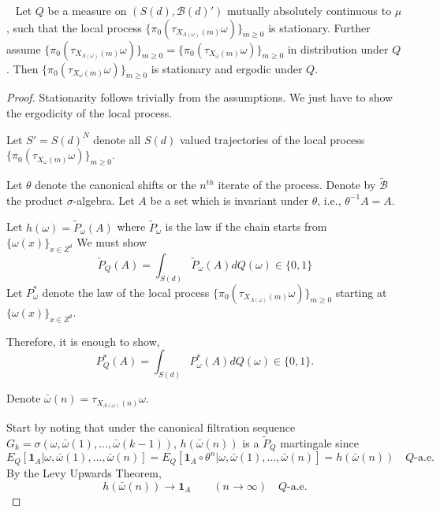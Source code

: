 \documentclass[10pt,a4paper]{amsart}
\def\mathbb#1{#1}%
\def\mathscr#1{#1}%
\begin{document}
\begin{lemma}~\label{equivalence}
    Let $\mathbb{Q}$ be a measure on $(\mathscr{S}(d), \mathcal{B}(d)')$ mutually absolutely continuous to
   $\mu$, such that the local process $\{\pi_0(\tau_{X_{\Lambda(\omega)}(m)}\omega)\}_{m \geq 0}$ is stationary. Further assume $\{\pi_0(\tau_{X_{\Lambda(\omega)}(m)}\omega)\}_{m \geq 0}=\{\pi_0(\tau_{X_{\omega}(m)}\omega)\}_{m \geq 0}$ in distribution under $\mathbb{Q}$. Then $\{\pi_0(\tau_{X_{\omega}(m)}\omega)\}_{m \geq 0}$ is stationary and ergodic under $\mathbb{Q}$.
\end{lemma}

\begin{proof}
Stationarity follows trivially from the assumptions. We just have to show the ergodicity of the local process. 

Let $\mathscr{S}'= S(d)^{\mathbb{N}}$ denote all $S(d)$ valued trajectories of the local process $\{\pi_0(\tau_{X_{\omega}(m)}\omega)\}_{m \geq 0}$.

Let $\theta$ denote the canonical shifts or the $n^{th}$ iterate of the process. Denote by $\tilde{\mathcal{B}}$ the product $\sigma$-algebra. Let $A$ be a set which is invariant under $\theta$, i.e., $\theta^{-1} A = A$. 
 
Let $h(\omega) =\tilde{P}_{\omega}(A) $ where $\tilde{P}_\omega$ is the law if the chain starts from \\$\{\omega(x)\}_{x \in \mathbb{Z}^d}$
We must show 
\[
\tilde{P}_{\mathbb{Q}} (A) = \int_{\mathscr{S}(d)} \tilde{P}_{\omega}(A) d\mathbb{Q}(\omega) \in \{0,1\}
\]
Let $P^*_{\omega}$ denote the law of the local process $\{\pi_0(\tau_{X_{\Lambda(\omega)}(m)}\omega)\}_{m \geq 0}$ starting at $\{\omega(x)\}_{x \in \mathbb{Z}^d}$. 

Therefore, it is enough to show, \[
{P}^*_{\mathbb{Q}} (A) = \int_{\mathscr{S}(d)}P^*_{\omega}(A) d\mathbb{Q}(\omega) \in  \{0, 1\}.
\]

Denote $\bar{\omega}(n) = \tau_{X_{\Lambda(\omega)}(n)} \omega$. 

Start by noting that under the canonical filtration sequence $\mathscr{G}_{k}= \sigma(\omega, \bar{\omega}(1),\dots,\bar{\omega}(k-1))$,  
$h(\bar{\omega}(n))$ is a $\tilde{P}_{\mathbb{Q}}$ martingale since 
\[
\mathbb{E}_{\mathbb{Q}} [ \boldsymbol{1}_{A}| \omega, \bar{\omega}(1),\dots, \bar{\omega}({n}) ] = \mathbb{E}_{\mathbb{Q}} [ \boldsymbol{1}_{A}\circ \theta^n | \omega, \bar{\omega}(1),\dots, \bar{\omega}({n}) ] = h(\bar{\omega}(n)) \quad \mathbb{Q}\text{-a.e.}
\]
By the Levy Upwards Theorem,
\begin{equation}\label{eq:marty}
h(\bar{\omega}(n)) \to \boldsymbol{1}_A \qquad (n \to \infty) \quad\mathbb{Q}\text{-a.e.}
\end{equation}


\end{proof}
\end{document}
